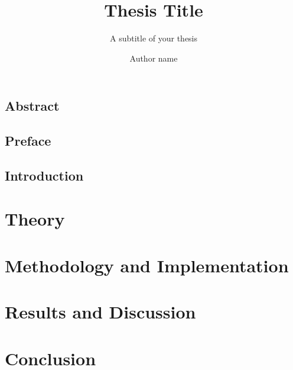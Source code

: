 \documentclass[UKenglish]{ifimaster}  %
\title{Thesis Title}        %
\subtitle{A subtitle of your thesis }         %
\author{Author name}                      %
\begin{document}
\duoforside[dept={Department Name <change at main.tex>},   %
  program={Master's Program Name <change at main.tex>},  %
  long]                                        %

\frontmatter{}
\chapter*{Abstract}                   %

\tableofcontents{}
\listoffigures{}
\listoftables{}

\chapter*{Preface}                    %

\mainmatter{}

\chapter{Introduction}                  %


\part{Theory}                    %





\part{Methodology and Implementation}



\part{Results and Discussion}

\part{Conclusion}

\backmatter{}
\printbibliography
\end{document}

